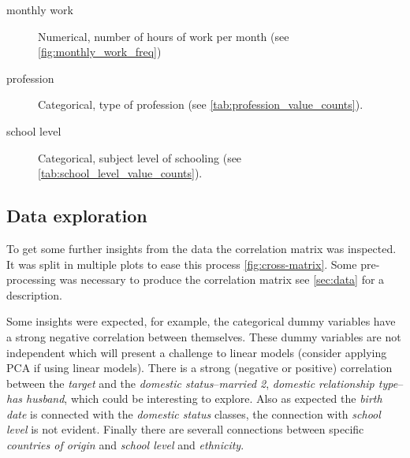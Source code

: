 \begin{description}
\item [monthly work] Numerical, number of hours of work per month
    (see \vref{fig:monthly_work_freq})

\item [profession] Categorical, type of profession
    (see \vref{tab:profession_value_counts}).

\item [school level] Categorical, subject level of schooling
    (see \vref{tab:school_level_value_counts}).

\end{description}


\subsection{Data exploration}
\label{subsec:exploration}

To get some further insights from the data the correlation matrix was
inspected.
It was split in multiple plots to ease this process \vref{fig:cross-matrix}.
Some pre-processing was necessary to produce the correlation matrix
see \vref{sec:data} for a description.

Some insights were expected, for example, the categorical dummy variables
have a strong negative correlation between themselves.
These dummy variables are not independent which will present a challenge
to linear models (consider applying PCA if using linear models).
There is a strong (negative or positive) correlation between the \emph{target}
and the \emph{domestic status}--\emph{married 2},
\emph{domestic relationship type}--\emph{has husband}, which could be
interesting to explore.
Also as expected the \emph{birth date} is connected with the
\emph{domestic status} classes, the connection with \emph{school level} is
not evident.
Finally there are severall connections between specific \emph{countries of
origin} and \emph{school level} and \emph{ethnicity}.

